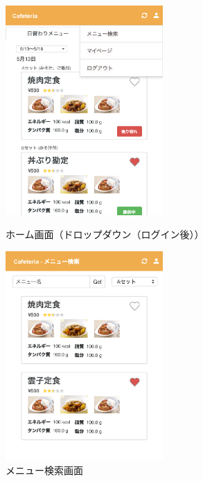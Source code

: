 \documentclass[a4paper]{ltjsarticle}
\begin{document}
        \begin{figure}[ht]
            \begin{minipage}[t]{.49\textwidth}
                \center
                \includegraphics[width=60mm]{ui/home-dropdown.png}
                \caption{ホーム画面（ドロップダウン（ログイン後））}
                \label{img:home-dropdown}
            \end{minipage}
            \begin{minipage}[t]{.49\textwidth}
                \center
                \includegraphics[width=60mm]{ui/menu-search.png}
                \caption{メニュー検索画面}
                \label{img:menu-search}
            \end{minipage}
        \end{figure}
\end{document}
